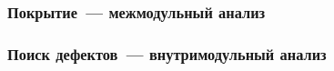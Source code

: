 \documentclass[hyperref={pdfpagelabels=false}]{beamer}
\begin{document}
\begin{frame}
\frametitle{Покрытие~--- межмодульный анализ}
\begin{figure}[h]
\end{figure}
\end{frame}

\begin{frame}
\frametitle{Поиск дефектов~--- внутримодульный анализ}
\begin{figure}[h]
\end{figure}
\end{frame}
\end{document}
